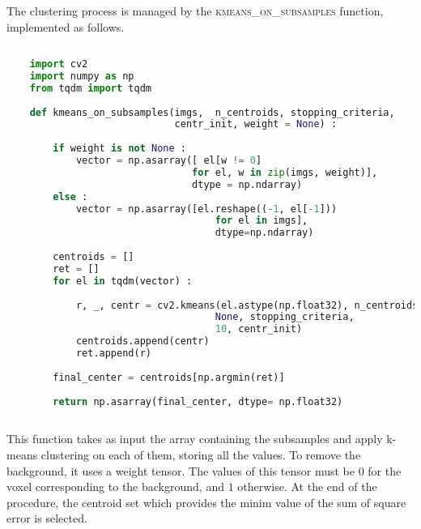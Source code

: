 \documentclass{standalone}
\begin{document}
	The clustering process is managed by the \textsc{kmeans\_on\_subsamples} function, implemented as follows. 
	\lstset{style=python}
	\begin{lstlisting}[language=python, caption=kmenas\_on\_subsamples, label=code:kmeans]
		
	import cv2
	import numpy as np
	from tqdm import tqdm
		
	def kmeans_on_subsamples(imgs,  n_centroids, stopping_criteria, 
							 centr_init, weight = None) :
		
		if weight is not None :
			vector = np.asarray([ el[w != 0] 
								for el, w in zip(imgs, weight)], 
								dtype = np.ndarray)
		else :
			vector = np.asarray([el.reshape((-1, el[-1])) 
									for el in imgs], 
									dtype=np.ndarray)
		
		centroids = []
		ret = []
		for el in tqdm(vector) :
		
			r, _, centr = cv2.kmeans(el.astype(np.float32), n_centroids, 
									None, stopping_criteria, 
									10, centr_init)				
			centroids.append(centr)
			ret.append(r)
			
		final_center = centroids[np.argmin(ret)]
		
		return np.asarray(final_center, dtype= np.float32)
		
	\end{lstlisting}
	This function takes as input the array containing the subsamples and apply k-means clustering on each of them, storing all the values.
	To remove the background, it uses a weight tensor. The values of this tensor must be $0$ for the voxel corresponding to the background, and $1$ otherwise. 
	At the end of the procedure, the centroid set which provides the minim value of the sum of square error is selected.


	
	
	
\end{document}
